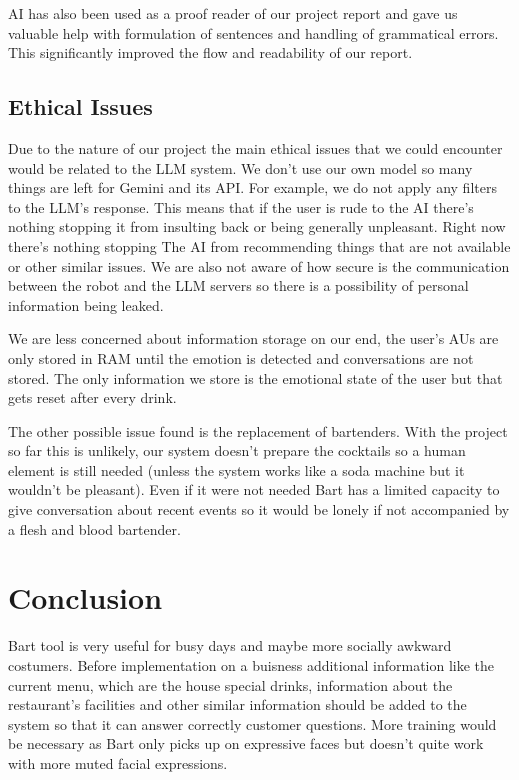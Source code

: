 \documentclass[conference]{IEEEtran}
\begin{document}
AI has also been used as a proof reader of our project report and gave us valuable help with formulation of sentences and handling of grammatical errors. This significantly improved the flow and readability of our report. 

\subsection{Ethical Issues}
Due to the nature of our project the main ethical issues that we could encounter would be related to the LLM system.
We don't use our own model so many things are left for Gemini and its API. For example, we do not apply any filters to the LLM's response.
This means that if the user is rude to the AI there's nothing stopping it from insulting back or being generally unpleasant. Right now there's nothing stopping
The AI from recommending things that are not available or other similar issues. We are also not aware of how secure is the communication between the robot
and the LLM servers so there is a possibility of personal information being leaked.

We are less concerned about information storage on our end, the user's AUs are only stored in RAM until the emotion is detected and conversations are not stored.
The only information we store is the emotional state of the user but that gets reset after every drink.

The other possible issue found is the replacement of bartenders. With the project so far this is unlikely,
our system doesn't prepare the cocktails so a human element is still needed (unless the system works like a soda machine but
it wouldn't be pleasant). Even if it were not needed Bart has a limited capacity to give conversation about recent events so it would be lonely if not accompanied by a flesh and blood bartender.




\section*{Conclusion}
Bart tool is very useful for busy days and maybe more socially awkward costumers. Before implementation on a buisness additional information like
the current menu, which are the house special drinks, information about the restaurant's facilities and other similar information should be added
to the system so that it can answer correctly customer questions. More training would be necessary as Bart only picks up on expressive faces
but doesn't quite work with more muted facial expressions. 
\end{document}
